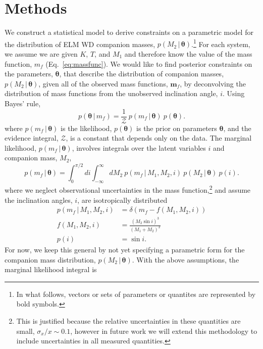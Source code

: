 \documentclass[letterpaper,12pt,preprint]{aastex}
\newcommand{\given}{\,|\,}
\newcommand{\bs}[1]{\boldsymbol{#1}}
\begin{document}
\section{Methods}

We construct a statistical model to derive constraints on a parametric model for the distribution of ELM WD companion masses, $p(M_2 \given \bs{\theta})$.\footnote{In what follows, vectors or sets of parameters or quantites are represented by bold symbols.} For each system, we assume we are given $K$, $T$, and $M_1$ and therefore know the value of the mass function, $m_f$ (Eq.~\ref{eq:massfunc}). We would like to find posterior constraints on the parameters, $\bs{\theta}$, that describe the distribution of companion masses, $p(M_2\given \bs{\theta})$, given all of the observed mass functions, $\bs{m}_f$, by deconvolving the distribution of mass functions from the unobserved inclination angle, $i$. Using Bayes' rule,
\begin{equation}
    p(\bs{\theta} \given m_f) = \frac{1}{\mathcal{Z}}~p(m_f \given \bs{\theta})~p(\bs{\theta}).
\end{equation}
where $p(m_f \given \bs{\theta})$ is the likelihood, $p(\bs{\theta})$ is the prior on parameters $\bs{\theta}$, and the evidence integral, $\mathcal{Z}$, is a constant that depends only on the data. The marginal likelihood, $p(m_f \given \bs{\theta})$, involves integrals over the latent variables $i$ and companion mass, $M_2$,
\begin{equation}
    p(m_f \given \bs{\theta}) = \int_0^{\pi/2} di \int_{-\infty}^\infty dM_2~p(m_f \given M_1, M_2, i)~p(M_2 \given \bs{\theta})~p(i).
\end{equation}
where we neglect observational uncertainties in the mass function,\footnote{This is justified because the relative uncertainties in these quantities are small, $\sigma_x / x \sim 0.1$, however in future work we will extend this methodology to include uncertainties in all measured quantities.} and assume the inclination angles, $i$, are isotropically distributed
\begin{align}
	p(m_f \given M_1, M_2, i) &= \delta(m_f - f(M_1, M_2, i))\\
	f(M_1, M_2, i) &= \frac{(M_2 \sin i)^3}{(M_1 + M_2)^2}\\
	p(i) &= \sin i.
\end{align}
For now, we keep this general by not yet specifying a parametric form for the companion mass distribution, $p(M_2 \given \bs{\theta})$. With the above assumptions, the marginal likelihood integral is
\end{document}
